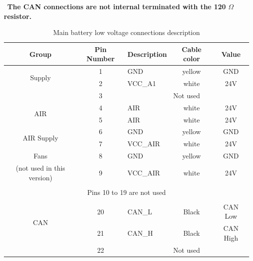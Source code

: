 \begin{mdframed}[backgroundcolor=red!20, roundcorner=10pt, innertopmargin=5pt, innerbottommargin=5pt, skipabove=5pt]
	\Warning \, \textbf{The CAN connections are not internal terminated with the 120 $\Omega$ resistor.}
\end{mdframed}

\begin{table}
	\centering
	\begin{tabular}{cclcc}
		\toprule
		\textbf{Group} & \textbf{Pin Number} & \textbf{Description} & \textbf{Cable color} & \textbf{Value}\\
		\midrule
		\multirow{2}{*}{Supply}& 1 & GND     & yellow & GND	\\
		 & 2 & VCC\_A1 & white  & 24V \\
		 \midrule
		 & 3 & \multicolumn{3}{c}{Not used} \\
		 \midrule
		 \multirow{2}{*}{AIR} & 4 & AIR     & white  & 24V \\	
		 & 5 & AIR     & white  & 24V \\
		 \midrule
		 \multirow{2}{*}{AIR Supply}& 6 & GND	    & yellow & GND \\
		 & 7 & VCC\_AIR  & white  & 24V \\
		 \midrule
		 Fans & 8 & GND	    & yellow & GND \\
		 (not used in this version) & 9 & VCC\_AIR  & white  & 24V \\
		 \midrule
		 \vspace{1pt}\\
		 \multicolumn{5}{c}{Pins 10 to 19 are not used}\\
		 \vspace{1pt}\\
		 \midrule
		 \multirow{2}{*}{CAN}& 20 & CAN\_L & Black & CAN Low \\
		 & 21 & CAN\_H  & Black  & CAN High \\
		 \midrule
		  & 22 & \multicolumn{3}{c}{Not used} \\
		\bottomrule
	\end{tabular}
	\caption{Main battery low voltage connections description}
	\label{tab:lv_connections}
\end{table}


